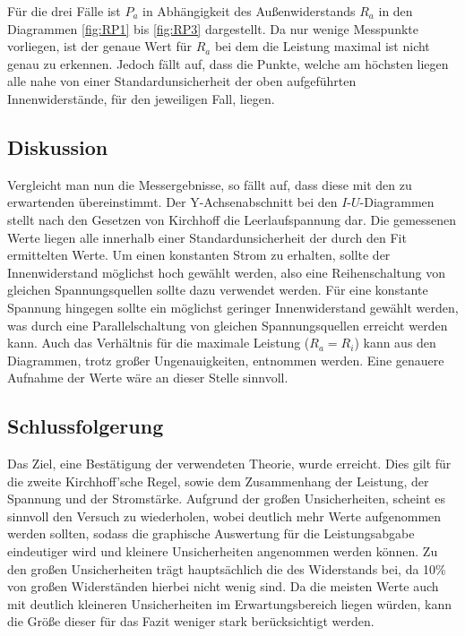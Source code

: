 Für die drei Fälle ist $P_a$ in Abhängigkeit des Außenwiderstands $R_a$ in den Diagrammen \ref{fig:RP1} bis \ref{fig:RP3} dargestellt. 
Da nur wenige Messpunkte vorliegen, ist der genaue Wert für $R_a$ bei dem die Leistung maximal ist nicht genau zu erkennen.
Jedoch fällt auf, dass die Punkte, welche am höchsten liegen alle nahe von einer Standardunsicherheit der oben aufgeführten Innenwiderstände, für den jeweiligen Fall, liegen.

\subsection{Diskussion}

Vergleicht man nun die Messergebnisse, so fällt auf, dass diese mit den zu erwartenden übereinstimmt. 
Der Y-Achsenabschnitt bei den $I$-$U$-Diagrammen stellt nach den Gesetzen von Kirchhoff die Leerlaufspannung dar.
Die gemessenen Werte liegen alle innerhalb einer Standardunsicherheit der durch den Fit ermittelten Werte.
Um einen konstanten Strom zu erhalten, sollte der Innenwiderstand möglichst hoch gewählt werden, also eine Reihenschaltung von gleichen Spannungsquellen sollte dazu verwendet werden.
Für eine konstante Spannung hingegen sollte ein möglichst geringer Innenwiderstand gewählt werden, was durch eine Parallelschaltung von gleichen Spannungsquellen erreicht werden kann.
Auch das Verhältnis für die maximale Leistung ($R_a = R_i$) kann aus den Diagrammen, trotz großer Ungenauigkeiten, entnommen werden.
Eine genauere Aufnahme der Werte wäre an dieser Stelle sinnvoll.

\subsection{Schlussfolgerung}

Das Ziel, eine Bestätigung der verwendeten Theorie, wurde erreicht. 
Dies gilt für die zweite Kirchhoff'sche Regel, sowie dem Zusammenhang der Leistung, der Spannung und der Stromstärke.
Aufgrund der großen Unsicherheiten, scheint es sinnvoll den Versuch zu wiederholen, wobei deutlich mehr Werte aufgenommen werden sollten, sodass die graphische Auswertung für die Leistungsabgabe eindeutiger wird und kleinere Unsicherheiten angenommen werden können.
Zu den großen Unsicherheiten trägt hauptsächlich die des Widerstands bei, da 10\% von großen Widerständen hierbei nicht wenig sind.
Da die meisten Werte auch mit deutlich kleineren Unsicherheiten im Erwartungsbereich liegen würden, kann die Größe dieser für das Fazit weniger stark berücksichtigt werden.
